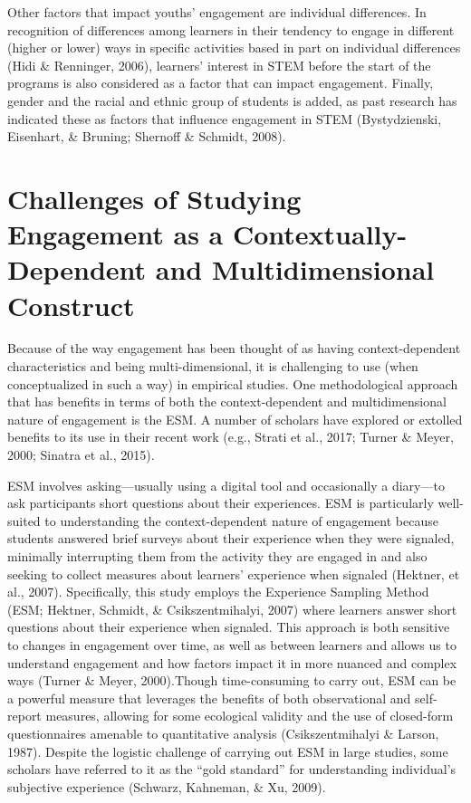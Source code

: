 \documentclass[]{book}
\theoremstyle{definition}
\theoremstyle{definition}
\theoremstyle{definition}
\theoremstyle{remark}
\begin{document}
Other factors that impact youths' engagement are individual differences.
In recognition of differences among learners in their tendency to engage
in different (higher or lower) ways in specific activities based in part
on individual differences (Hidi \& Renninger, 2006), learners' interest
in STEM before the start of the programs is also considered as a factor
that can impact engagement. Finally, gender and the racial and ethnic
group of students is added, as past research has indicated these as
factors that influence engagement in STEM (Bystydzienski, Eisenhart, \&
Bruning; Shernoff \& Schmidt, 2008).

\section{Challenges of Studying Engagement as a Contextually-Dependent
and Multidimensional
Construct}\label{challenges-of-studying-engagement-as-a-contextually-dependent-and-multidimensional-construct}

Because of the way engagement has been thought of as having
context-dependent characteristics and being multi-dimensional, it is
challenging to use (when conceptualized in such a way) in empirical
studies. One methodological approach that has benefits in terms of both
the context-dependent and multidimensional nature of engagement is the
ESM. A number of scholars have explored or extolled benefits to its use
in their recent work (e.g., Strati et al., 2017; Turner \& Meyer, 2000;
Sinatra et al., 2015).

ESM involves asking---usually using a digital tool and occasionally a
diary---to ask participants short questions about their experiences. ESM
is particularly well-suited to understanding the context-dependent
nature of engagement because students answered brief surveys about their
experience when they were signaled, minimally interrupting them from the
activity they are engaged in and also seeking to collect measures about
learners' experience when signaled (Hektner, et al., 2007).
Specifically, this study employs the Experience Sampling Method (ESM;
Hektner, Schmidt, \& Csikszentmihalyi, 2007) where learners answer short
questions about their experience when signaled. This approach is both
sensitive to changes in engagement over time, as well as between
learners and allows us to understand engagement and how factors impact
it in more nuanced and complex ways (Turner \& Meyer, 2000).Though
time-consuming to carry out, ESM can be a powerful measure that
leverages the benefits of both observational and self-report measures,
allowing for some ecological validity and the use of closed-form
questionnaires amenable to quantitative analysis (Csikszentmihalyi \&
Larson, 1987). Despite the logistic challenge of carrying out ESM in
large studies, some scholars have referred to it as the ``gold
standard'' for understanding individual's subjective experience
(Schwarz, Kahneman, \& Xu, 2009).
\end{document}
